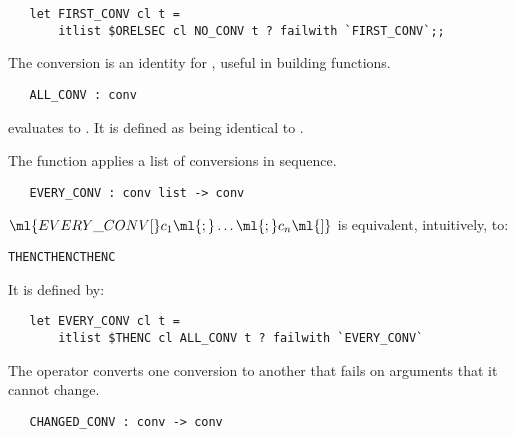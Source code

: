 \begin{hol}\begin{verbatim}
   let FIRST_CONV cl t =
       itlist $ORELSEC cl NO_CONV t ? failwith `FIRST_CONV`;;
\end{verbatim}\end{hol}

The conversion  is an identity for , useful
in building functions.

\begin{holboxed}
\begin{verbatim}
   ALL_CONV : conv
\end{verbatim}\end{holboxed}

\noindent {} evaluates to . It is
defined as being identical to .

The function  applies a list of conversions in sequence.

\begin{holboxed}
\begin{verbatim}
   EVERY_CONV : conv list -> conv
\end{verbatim}\end{holboxed}

\noindent $\ml{EVERY\_CONV [}c_1\ml{;}\ldots\ml{;}c_n\ml{]}$ is equivalent,
intuitively, to:

\begin{hol}
\begin{alltt}
    THENC  THENC \m{\ldots} THENC 
\end{alltt}\end{hol}

\noindent It is defined by:

\begin{hol}\begin{verbatim}
   let EVERY_CONV cl t =
       itlist $THENC cl ALL_CONV t ? failwith `EVERY_CONV`
\end{verbatim}\end{hol}

The operator  converts one conversion to another that
fails on arguments that it cannot change.

\begin{holboxed}
\begin{verbatim}
   CHANGED_CONV : conv -> conv
\end{verbatim}\end{holboxed}

